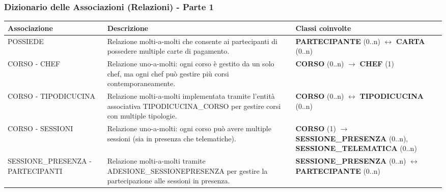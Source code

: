 \subsubsection{Dizionario delle Associazioni (Relazioni) - Parte 1}
\begin{center}
\begin{tcolorbox}[colback=white!98!gray, colframe=myblue!80!black, title=Dizionario delle Associazioni (Relazioni) - Parte 1, arc=4mm, boxrule=0.8pt, width=0.98\textwidth]
\renewcommand{\arraystretch}{1.2}
\begin{tabularx}{\textwidth}{p{3.8cm}p{4.2cm}X}
\textbf{Associazione} & \textbf{Descrizione} & \textbf{Classi coinvolte} \\
\hline
POSSIEDE & Relazione molti-a-molti che consente ai partecipanti di possedere multiple carte di pagamento. & \textbf{PARTECIPANTE} (0..n) $\leftrightarrow$ \textbf{CARTA} (0..n) \\
\hline
CORSO - CHEF & Relazione uno-a-molti: ogni corso è gestito da un solo chef, ma ogni chef può gestire più corsi contemporaneamente. & \textbf{CORSO} (0..n) $\rightarrow$ \textbf{CHEF} (1) \\
\hline
CORSO - TIPODICUCINA & Relazione molti-a-molti implementata tramite l'entità associativa TIPODICUCINA\_\-CORSO per gestire corsi con multiple tipologie. & \textbf{CORSO} (0..n) $\leftrightarrow$ \textbf{TIPODICUCINA} (0..n) \\
\hline
CORSO - SESSIONI & Relazione uno-a-molti: ogni corso può avere multiple sessioni (sia in presenza che telematiche). & \textbf{CORSO} (1) $\rightarrow$ \textbf{SESSIONE\_\-PRESENZA} (0..n), \textbf{SESSIONE\_\-TELEMATICA} (0..n) \\
\hline
SESSIONE\_\-PRESENZA - PARTECIPANTI & Relazione molti-a-molti tramite ADESIONE\_\-SESSIONEPRE\-SENZA per gestire la partecipazione alle sessioni in presenza. & \textbf{SESSIONE\_\-PRESENZA} (0..n) $\leftrightarrow$ \textbf{PARTECIPANTE} (0..n) \\
\hline
\end{tabularx}
\end{tcolorbox}
\end{center}

